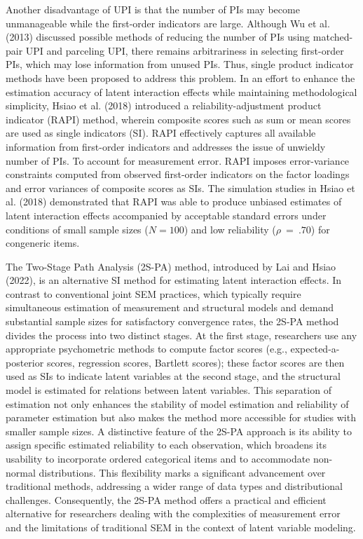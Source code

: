 \documentclass[
  man]{apa6}
\begin{document}
Another disadvantage of UPI is that the number of PIs may become unmanageable while the first-order indicators are large. Although Wu et al. (2013) discussed possible methods of reducing the number of PIs using matched-pair UPI and parceling UPI, there remains arbitrariness in selecting first-order PIs, which may lose information from unused PIs. Thus, single product indicator methods have been proposed to address this problem. In an effort to enhance the estimation accuracy of latent interaction effects while maintaining methodological simplicity, Hsiao et al. (2018) introduced a reliability-adjustment product indicator (RAPI) method, wherein composite scores such as sum or mean scores are used as single indicators (SI). RAPI effectively captures all available information from first-order indicators and addresses the issue of unwieldy number of PIs. To account for measurement error. RAPI imposes error-variance constraints computed from observed first-order indicators on the factor loadings and error variances of composite scores as SIs. The simulation studies in Hsiao et al. (2018) demonstrated that RAPI was able to produce unbiased estimates of latent interaction effects accompanied by acceptable standard errors under conditions of small sample sizes (\(N = 100\)) and low reliability (\(\rho \ = \ .70\)) for congeneric items.

The Two-Stage Path Analysis (2S-PA) method, introduced by Lai and Hsiao (2022), is an alternative SI method for estimating latent interaction effects. In contrast to conventional joint SEM practices, which typically require simultaneous estimation of measurement and structural models and demand substantial sample sizes for satisfactory convergence rates, the 2S-PA method divides the process into two distinct stages. At the first stage, researchers use any appropriate psychometric methods to compute factor scores (e.g., expected-a-posterior scores, regression scores, Bartlett scores); these factor scores are then used as SIs to indicate latent variables at the second stage, and the structural model is estimated for relations between latent variables. This separation of estimation not only enhances the stability of model estimation and reliability of parameter estimation but also makes the method more accessible for studies with smaller sample sizes. A distinctive feature of the 2S-PA approach is its ability to assign specific estimated reliability to each observation, which broadens its usability to incorporate ordered categorical items and to accommodate non-normal distributions. This flexibility marks a significant advancement over traditional methods, addressing a wider range of data types and distributional challenges. Consequently, the 2S-PA method offers a practical and efficient alternative for researchers dealing with the complexities of measurement error and the limitations of traditional SEM in the context of latent variable modeling.
\end{document}
